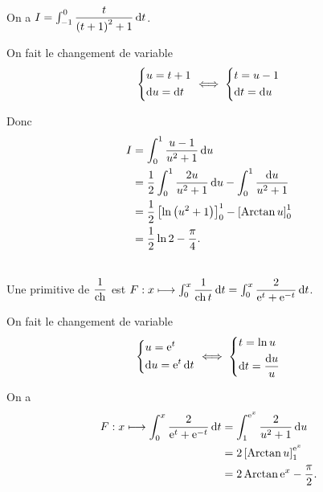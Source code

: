 \begin{corr}[1]~\\
On a \(I=\int_{-1}^0\dfrac{t}{\paren{t+1}^2+1}\odif{t}\).

On fait le changement de variable \[\begin{dcases}u=t+1 \\ \odif{u}=\odif{t}\end{dcases}\ssi\begin{dcases}t=u-1 \\ \odif{t}=\odif{u}\end{dcases}\]

Donc \[\begin{aligned}
I&=\int_0^1\dfrac{u-1}{u^2+1}\odif{u} \\
&=\dfrac{1}{2}\int_0^1\dfrac{2u}{u^2+1}\odif{u}-\int_0^1\dfrac{\odif{u}}{u^2+1} \\
&=\dfrac{1}{2}\croch{\ln\paren{u^2+1}}_0^1-\croch{\Arctan u}_0^1 \\
&=\dfrac{1}{2}\ln2-\dfrac{\pi}{4}.
\end{aligned}\]
\end{corr}

\begin{corr}[2]~\\
Une primitive de \(\dfrac{1}{\operatorname{ch}}\) est \(F:x\mapsto\int_0^x\dfrac{1}{\ch t}\odif{t}=\int_0^x\dfrac{2}{\e{t}+\e{-t}}\odif{t}\).

On fait le changement de variable \[\begin{dcases}u=\e{t} \\ \odif{u}=\e{t}\odif{t}\end{dcases}\ssi\begin{dcases}t=\ln u \\ \odif{t}=\dfrac{\odif{u}}{u}\end{dcases}\]

On a \[\begin{aligned}
F:x\mapsto\int_0^x\dfrac{2}{\e{t}+\e{-t}}\odif{t}&=\int_1^{\e{x}}\dfrac{2}{u^2+1}\odif{u} \\
&=2\croch{\Arctan u}_1^{\e{x}} \\
&=2\Arctan\e{x}-\dfrac{\pi}{2}.
\end{aligned}\]
\end{corr}

